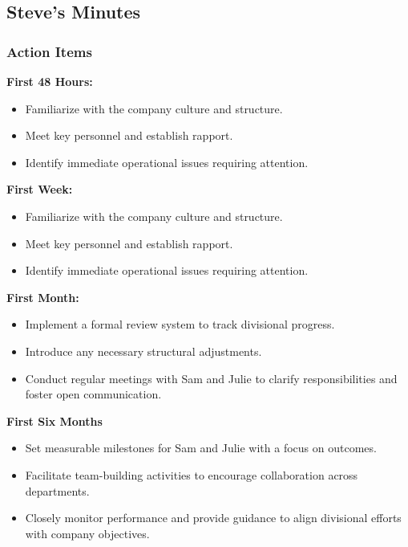 \documentclass[a4paper,10pt]{article}
\begin{document}
\subsection{Steve's Minutes}
\author{Bahne Thiel-Peters (Julie)}

\subsubsection{Action Items}

\noindent \textbf{First 48 Hours: }
\begin{itemize}
    \item Familiarize with the company culture and structure.
    \item Meet key personnel and establish rapport.
    \item Identify immediate operational issues requiring attention.
\end{itemize}

\noindent \textbf{First Week:}
\begin{itemize}
    \item Familiarize with the company culture and structure.
    \item Meet key personnel and establish rapport.
    \item Identify immediate operational issues requiring attention.
\end{itemize}

\noindent \textbf{First Month:}
\begin{itemize}
    \item Implement a formal review system to track divisional progress.
    \item Introduce any necessary structural adjustments.
    \item Conduct regular meetings with Sam and Julie to clarify responsibilities and foster open communication.
\end{itemize}

\noindent \textbf{First Six Months}
\begin{itemize}
    \item Set measurable milestones for Sam and Julie with a focus on outcomes.
    \item Facilitate team-building activities to encourage collaboration across departments.
    \item Closely monitor performance and provide guidance to align divisional efforts with company objectives.
\end{itemize}
\end{document}
